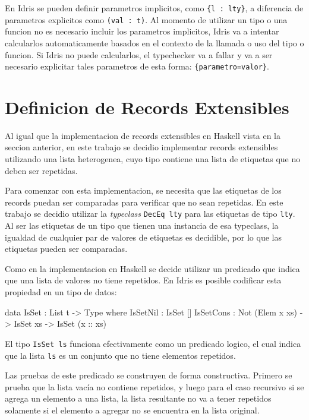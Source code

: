 En Idris se pueden definir parametros implicitos, como \texttt{\{l : lty\}}, a diferencia de parametros explicitos como \texttt{(val : t)}. Al momento de utilizar un tipo o una funcion no es necesario incluir los parametros implicitos, Idris va a intentar calcularlos automaticamente basados en el contexto de la llamada o uso del tipo o funcion. Si Idris no puede calcularlos, el typechecker va a fallar y va a ser necesario explicitar tales parametros de esta forma: \texttt{\{parametro=valor\}}.

\section{Definicion de Records Extensibles}

Al igual que la implementacion de records extensibles en Haskell vista en la seccion anterior, en este trabajo se decidio implementar records extensibles utilizando una lista heterogenea, cuyo tipo contiene una lista de etiquetas que no deben ser repetidas.

Para comenzar con esta implementacion, se necesita que las etiquetas de los records puedan ser comparadas para verificar que no sean repetidas. En este trabajo se decidio utilizar la \textit{typeclass} \texttt{DecEq lty} para las etiquetas de tipo \texttt{lty}. Al ser las etiquetas de un tipo que tienen una instancia de esa typeclass, la igualdad de cualquier par de valores de etiquetas es decidible, por lo que las etiquetas pueden ser comparadas.

Como en la implementacion en Haskell se decide utilizar un predicado que indica que una lista de valores no tiene repetidos.
En Idris es posible codificar esta propiedad en un tipo de datos:

\begin{code}
data IsSet : List t -> Type where
  IsSetNil : IsSet []
  IsSetCons : Not (Elem x xs) -> IsSet xs -> 
    IsSet (x :: xs)
\end{code}

El tipo \texttt{IsSet ls} funciona efectivamente como un predicado logico, el cual indica que la lista \texttt{ls} es un conjunto que no tiene elementos repetidos.

Las pruebas de este predicado se construyen de forma constructiva. Primero se prueba que la lista vacía no contiene repetidos, y luego para el caso recursivo si se agrega un elemento a una lista, la lista resultante no va a tener repetidos solamente si el elemento a agregar no se encuentra en la lista original.


